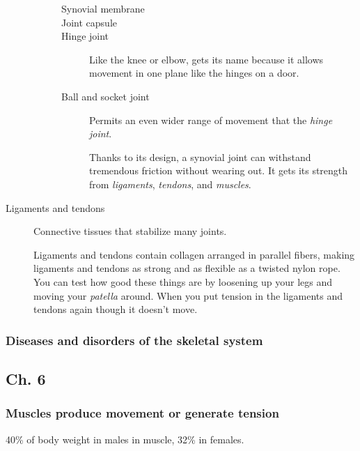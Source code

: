 \documentclass[11pt]{article}
\begin{document}
\begin{description}
\begin{description}
\begin{description}
\item[{Synovial membrane}] 


\item[{Joint capsule}] 


\item[{Hinge joint}] Like the knee or elbow, gets its name because it allows
movement in one plane like the hinges on a door.

\item[{Ball and socket joint}] Permits an even wider range of movement that
the \emph{hinge joint}.

Thanks to its design, a synovial joint can withstand tremendous
friction without wearing out. It gets its strength from
\emph{ligaments}, \emph{tendons}, and \emph{muscles}.
\end{description}
\end{description}

\item[{Ligaments and tendons}] Connective tissues that stabilize many joints.

Ligaments and tendons contain collagen arranged in parallel fibers,
making ligaments and tendons as strong and as flexible as a twisted
nylon rope. You can test how good these things are by loosening up your
legs and moving your \emph{patella} around. When you put tension in the
ligaments and tendons again though it doesn't move.
\end{description}

\subsubsection{Diseases and disorders of the skeletal system}
\label{sec:org584d907}
\subsection{Ch. 6}
\label{sec:orgbaeb300}
\subsubsection{Muscles produce movement or generate tension}
\label{sec:org15e2457}
40\% of body weight in males in muscle, 32\% in females.
\end{document}
